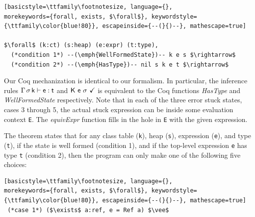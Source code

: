 \documentclass[runnningheads]{tex/llncs}
\begin{document}
\begin{lstlisting}[basicstyle=\ttfamily\footnotesize, language={}, 
morekeywords={forall, exists, $\forall$}, keywordstyle={\ttfamily\color{blue!80}}, escapeinside={--(}{)--}, mathescape=true]

$\forall$ (k:ct) (s:heap) (e:expr) (t:type),
  (*condition 1*) --(\emph{WellFormedState})-- k e s $\rightarrow$ 
  (*condition 2*) --(\emph{HasType})-- nil s k e t $\rightarrow$ 
\end{lstlisting}

Our Coq mechanization is identical to our formalism. In particular, the
inference rules $\EnvType\Env\s\k\e\t$ and $\WFq{\K~\e~\s}$ is equivalent to
the Coq functions \emph{HasType} and \emph{WellFormedState} respectively.
Note that in each of the three error stuck states, cases 3 through 5, the
actual stuck expression can be inside some evaluation context \verb|E|. The
\emph{equivExpr} function fills in the hole in \verb|E| with the given
expression.

The theorem states that for any class table (\verb|k|), heap (\verb|s|),
expression (\verb|e|), and type (\verb|t|), if the state is well formed
(condition 1), and if the top-level expression \verb|e| has type \verb|t|
(condition 2), then the program can only make one of the following five
choices:

\begin{lstlisting}[basicstyle=\ttfamily\footnotesize, language={}, 
morekeywords={forall, exists, $\forall$}, keywordstyle={\ttfamily\color{blue!80}}, escapeinside={--(}{)--}, mathescape=true]  
 (*case 1*) ($\exists$ a:ref, e = Ref a) $\vee$
\end{lstlisting}
\end{document}

